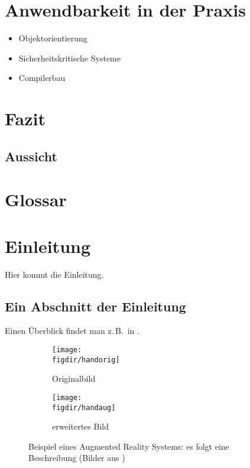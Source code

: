 \section{Anwendbarkeit in der Praxis}
\begin{itemize}
	\item Objektorientierung
	\item Sicherheitskritische Systeme
	\item Compilerbau
\end{itemize}


\section{Fazit}
\subsection{Aussicht}

\section{Glossar}


\section{Einleitung}
\label{s:intro}

Hier kommt die Einleitung.


\subsection{Ein Abschnitt der Einleitung}
\label{ss:intro:abc}

Einen Überblick findet man z.\,B.\ in \cite{Auer00:HTF}.

\begin{figure}[t]
	\centering
	
	\begin{subfigure}{0.45\linewidth}
		\centering
		\texttt{[image: \\figdir/handorig]}
		\caption{Originalbild}
		\label{FIG:arexorig}
	\end{subfigure}
	\begin{subfigure}{0.45\linewidth}
		\centering
		\texttt{[image: \\figdir/handaug]}
		\caption{erweitertes Bild}
		\label{FIG:arexaugm}
	\end{subfigure}
	\caption[AR Beispiel]
	{Beispiel eines Augmented Reality Systems: es folgt eine Beschreibung (Bilder aus \cite{Schmidt01:PAO})}
	\label{FIG:arex}
\end{figure}

